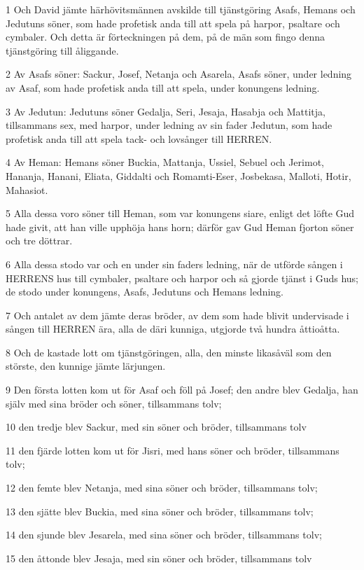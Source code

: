 \par 1 Och David jämte härhövitsmännen avskilde till tjänstgöring Asafs, Hemans och Jedutuns söner, som hade profetisk anda till att spela på harpor, psaltare och cymbaler. Och detta är förteckningen på dem, på de män som fingo denna tjänstgöring till åliggande.
\par 2 Av Asafs söner: Sackur, Josef, Netanja och Asarela, Asafs söner, under ledning av Asaf, som hade profetisk anda till att spela, under konungens ledning.
\par 3 Av Jedutun: Jedutuns söner Gedalja, Seri, Jesaja, Hasabja och Mattitja, tillsammans sex, med harpor, under ledning av sin fader Jedutun, som hade profetisk anda till att spela tack- och lovsånger till HERREN.
\par 4 Av Heman: Hemans söner Buckia, Mattanja, Ussiel, Sebuel och Jerimot, Hananja, Hanani, Eliata, Giddalti och Romamti-Eser, Josbekasa, Malloti, Hotir, Mahasiot.
\par 5 Alla dessa voro söner till Heman, som var konungens siare, enligt det löfte Gud hade givit, att han ville upphöja hans horn; därför gav Gud Heman fjorton söner och tre döttrar.
\par 6 Alla dessa stodo var och en under sin faders ledning, när de utförde sången i HERRENS hus till cymbaler, psaltare och harpor och så gjorde tjänst i Guds hus; de stodo under konungens, Asafs, Jedutuns och Hemans ledning.
\par 7 Och antalet av dem jämte deras bröder, av dem som hade blivit undervisade i sången till HERREN ära, alla de däri kunniga, utgjorde två hundra åttioåtta.
\par 8 Och de kastade lott om tjänstgöringen, alla, den minste likasåväl som den störste, den kunnige jämte lärjungen.
\par 9 Den första lotten kom ut för Asaf och föll på Josef; den andre blev Gedalja, han själv med sina bröder och söner, tillsammans tolv;
\par 10 den tredje blev Sackur, med sin söner och bröder, tillsammans tolv
\par 11 den fjärde lotten kom ut för Jisri, med hans söner och bröder, tillsammans tolv;
\par 12 den femte blev Netanja, med sina söner och bröder, tillsammans tolv;
\par 13 den sjätte blev Buckia, med sina söner och bröder, tillsammans tolv;
\par 14 den sjunde blev Jesarela, med sina söner och bröder, tillsammans tolv;
\par 15 den åttonde blev Jesaja, med sin söner och bröder, tillsammans tolv

